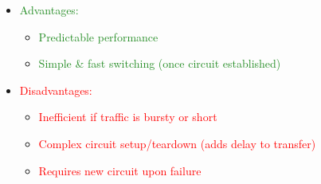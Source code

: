 \documentclass[a4paper, fontsize=8pt, landscape, DIV=1]{scrartcl}
\begin{document}
\begin{multicols*}{4}
				\begin{itemize}[noitemsep]
					\item \textcolor{ForestGreen}{Advantages:}
					\begin{itemize}
						\item \textcolor{ForestGreen}{Predictable performance} 
						\item \textcolor{ForestGreen}{Simple \& fast switching (once circuit established)}
					\end{itemize}
					\item \textcolor{red}{Disadvantages:}
					\begin{itemize}
						\item \textcolor{red}{Inefficient if traffic is bursty or short}
						\item \textcolor{red}{Complex circuit setup/teardown (adds delay to transfer)}
						\item \textcolor{red}{Requires new circuit upon failure}
					\end{itemize} 
				\end{itemize}
				\columnbreak
				

\end{multicols*}
\end{document}
